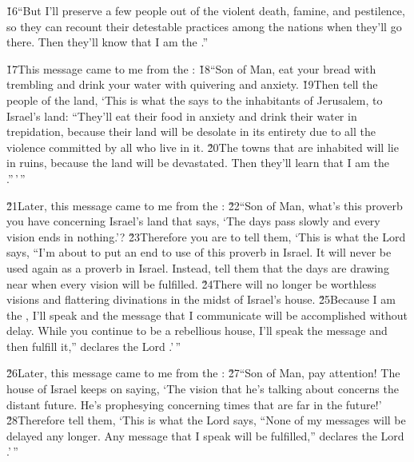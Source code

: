 \v{16}``But I'll preserve a few people out of the violent death, famine, and pestilence, so they can recount their detestable practices among the nations when they'll go there. Then they'll know that I am the .''

\v{17}This message came to me from the : \v{18}``Son of Man, eat your bread with trembling and drink your water with quivering and anxiety. \v{19}Then tell the people of the land, `This is what the  says to the inhabitants of Jerusalem, to Israel's land: ``They'll eat their food in anxiety and drink their water in trepidation, because their land will be desolate in its entirety due to all the violence committed by all who live in it. \v{20}The towns that are inhabited will lie in ruins, because the land will be devastated. Then they'll learn that I am the .''\,'\,''

\v{21}Later, this message came to me from the : \v{22}``Son of Man, what's this proverb you have concerning Israel's land that says, `The days pass slowly and every vision ends in nothing.'? \v{23}Therefore you are to tell them, `This is what the Lord  says, ``I'm about to put an end to use of this proverb in Israel. It will never be used again as a proverb in Israel. Instead, tell them that the days are drawing near when every vision will be fulfilled. \v{24}There will no longer be worthless visions and flattering divinations in the midst of Israel's house. \v{25}Because I am the , I'll speak and the message that I communicate will be accomplished without delay. While you continue to be a rebellious house, I'll speak the message and then fulfill it,'' declares the Lord .'\,''

\v{26}Later, this message came to me from the : \v{27}``Son of Man, pay attention! The house of Israel keeps on saying, `The vision that he's talking about concerns the distant future. He's prophesying concerning times that are far in the future!' \v{28}Therefore tell them, `This is what the Lord  says, ``None of my messages will be delayed any longer. Any message that I speak will be fulfilled,'' declares the Lord .'\,''

